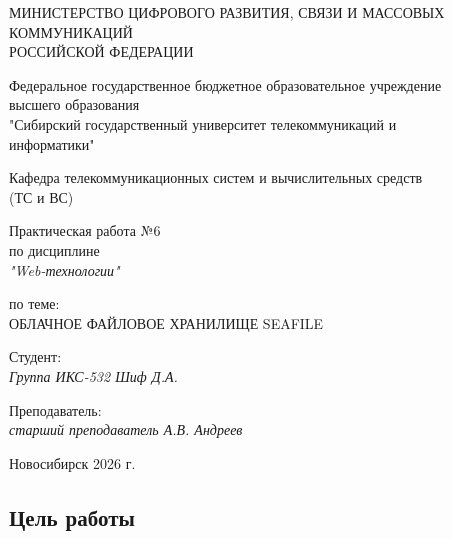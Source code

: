 \documentclass[a4paper,14pt,oneside,openany]{memoir}
\begin{document}
\thispagestyle{empty}

\begin{center}
    МИНИСТЕРСТВО ЦИФРОВОГО РАЗВИТИЯ, СВЯЗИ И МАССОВЫХ \\ КОММУНИКАЦИЙ \\ РОССИЙСКОЙ ФЕДЕРАЦИИ

    \vspace{20pt}

    Федеральное государственное бюджетное образовательное учреждение \\ высшего образования \\
    "Сибирский государственный университет телекоммуникаций и \\ информатики"

    \vspace{20pt}

    Кафедра телекоммуникационных систем и вычислительных средств \\ (ТС и ВС)
\end{center}

\vfill

\begin{center}
    Практическая работа №6 \\
    по дисциплине \\
    \textit{"Web-технологии"}

    \vspace{20pt}

    по теме: \\
    \uppercase{Облачное файловое хранилище Seafile}
\end{center}

\vfill

\noindent Студент: \\
\textit{Группа ИКС-532 \hfill Шиф Д.А.}

\vspace{20pt}

\noindent Преподаватель: \\
\textit{старший преподаватель \hfill А.В. Андреев}

\vfill

\begin{center}
    Новосибирск 2026 г.
\end{center}

\newpage
\setcounter{page}{2}
\OnehalfSpacing*

\subsection*{Цель работы}
\end{document}
